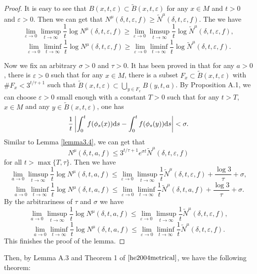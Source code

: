 \documentclass[10pt]{article}
\newtheorem*{Theorem A}{Theorem A}
\begin{document}
\begin{proof}
It is easy to see that $B(x, t, \varepsilon)\subset \tilde{B}(x, t, \varepsilon)$ for any $x\in M$ and $t>0$ and $\varepsilon>0$. Then we can get that $N^\mu(\delta, t, \varepsilon, f)\geq \tilde{N}^\mu(\delta, t, \varepsilon, f)$. The we have
\[
\lim_{\varepsilon \to 0} \limsup_{t \to \infty} \frac{1}{t} \log N^\mu(\delta, t, \varepsilon, f) \geq \lim_{\varepsilon \to 0} \limsup_{t \to \infty} \frac{1}{t} \log \tilde{N}^\mu(\delta, t, \varepsilon, f),
\]
\[
\lim_{\varepsilon \to 0} \liminf_{t \to \infty} \frac{1}{t} \log N^\mu(\delta, t, \varepsilon, f) \geq \lim_{\varepsilon \to 0} \liminf_{t \to \infty} \frac{1}{t} \log \tilde{N}^\mu(\delta, t, \varepsilon, f).
\]

Now we fix an arbitrary $\sigma>0$ and $\tau>0$. It has been proved in \cite{Thomas_1987} that for any $a>0$, there is $\varepsilon>0$ such that for any $x\in M$, there is a subset $F_x\subset \tilde{B}(x, t, \varepsilon)$ with $\# F_x<3^{t/\tau+1}$ such that $\tilde{B}(x, t, \varepsilon)\subset \bigcup\limits_{y\in F_x}B(y, t, a)$. By Proposition A.1, we can choose $\varepsilon>0$ small enough with a constant $T>0$ such that for any $t>T$, $x\in M$ and any $y\in \tilde{B}(x, t, \varepsilon)$, one has
$$\frac{1}{t}\left|\int_0^tf(\phi_s(x)){\rm d}s-\int_0^tf(\phi_s(y)){\rm d}s\right|<\sigma.$$
Similar to Lemma \ref{lemma3.4}, we can get that
$$N^\mu(\delta, t, a, f)\leq 3^{t/\tau+1}e^{\sigma t}\tilde{N}^\mu(\delta, t, \varepsilon, f)$$
for all $t>\max\{T, \tau\}$. Then we have
$$\lim_{a\to 0}\limsup_{t\to\infty}\frac{1}{t}\log N^\mu(\delta, t, a, f)\leq \lim_{\varepsilon\to 0}\limsup_{t\to\infty}\frac{1}{t}\tilde{N}^\mu(\delta, t, \varepsilon, f)+\frac{\log 3}{\tau}+\sigma,$$
$$\lim_{a\to 0}\liminf_{t\to\infty}\frac{1}{t}\log N^\mu(\delta, t, a, f)\leq \lim_{\varepsilon\to 0}\liminf_{t\to\infty}\frac{1}{t}\tilde{N}^\mu(\delta, t, a, f)+\frac{\log 3}{\tau}+\sigma.$$
By the arbitrariness of $\tau$ and $\sigma$ we have
$$\lim_{a\to 0}\limsup_{t\to\infty}\frac{1}{t}\log N^\mu(\delta, t, a, f)\leq \lim_{\varepsilon\to 0}\limsup_{t\to\infty}\frac{1}{t}\tilde{N}^\mu(\delta, t, \varepsilon, f),$$
$$\lim_{a\to 0}\liminf_{t\to\infty}\frac{1}{t}\log N^\mu(\delta, t, a, f)\leq \lim_{\varepsilon\to 0}\liminf_{t\to\infty}\frac{1}{t}\tilde{N}^\mu(\delta, t, \varepsilon, f).$$
This finishes the proof of the lemma.
\end{proof}


\noindent
Then, by Lemma A.3 and Theorem 1 of \(\cite{he2004metrical}\), we have the following theorem:
\end{document}
